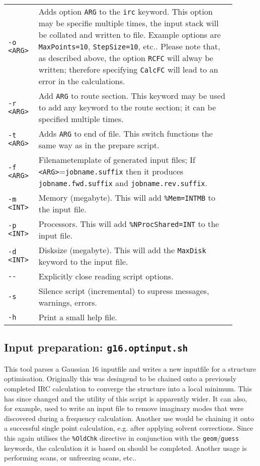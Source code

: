 \documentclass[   %
  final,          %
  a4paper         %
]{article}
\begin{document}
\begin{longtable}{p{0.1\linewidth}p{0.8\linewidth}}
  {\lstinline`-o <ARG>`} & Adds option {\lstinline`ARG`} to the \texttt{irc} keyword. 
    This option may be specifie multiple times, the input stack will be collated and written to file.
    Example options are \texttt{MaxPoints=10}, \texttt{StepSize=10}, etc.. 
    Please note that, as described above, the option \texttt{RCFC} will alway be written;
    therefore specifying \texttt{CalcFC} will lead to an error in the calculations.\\
  {\lstinline`-r <ARG>`} & Add {\lstinline`ARG`} to route section. 
    This keyword may be used to add any keyword to the route section; 
    it can be specified multiple times.\\
  {\lstinline`-t <ARG>`} & Adds {\lstinline`ARG`} to end of file. 
    This switch functions the same way as in the prepare script. \\
  {\lstinline`-f <ARG>`} & Filenametemplate of generated input files; %
    If {\lstinline`<ARG>`=}\texttt{jobname.suffix} then it produces \texttt{jobname.fwd.suffix} and \texttt{jobname.rev.suffix}. \\
  {\lstinline`-m <INT>`} & Memory (megabyte). This will add \texttt{\%Mem={\lstinline`INT`}MB} to the input file. \\
  {\lstinline`-p <INT>`} & Processors. This will add \texttt{\%NProcShared={\lstinline`INT`}} to the input file. \\
  {\lstinline`-d <INT>`} & Disksize (megabyte). This will add the \texttt{MaxDisk} keyword to the input file. \\
  {\lstinline`--`}       & Explicitly close reading script options. \\
  {\lstinline`-s`}       & Silence script (incremental) to supress messages, warnings, errors. \\
  {\lstinline`-h`}       & Print a small help file. \\
\end{longtable}

\subsection{Input preparation: \texorpdfstring{{\lstinline`g16.optinput.sh`}}{g16.optinput.sh}}
\label{sec:g16.optinput}

This tool parses a Gaussian 16 inputfile and writes a new inputfile for a structure optimisation.
Originally this was desingend to be chained onto a previously completed IRC calculation
to converge the structure into a local minimum.
This has since changed and the utility of this script is apparently wider.
It can also, for example, used to write an input file to remove imaginary modes that were 
discovered during a frequency calculation.
Another use would be chaining it onto a successful single point calculation,
e.g. after applying solvent corrections.
Since this again utilises the \texttt{\%OldChk} directive in conjunction with 
the \texttt{geom}/\texttt{guess} keywords, the calculation it is based on should be completed.
Another usage is performing scans, or unfreezing scans, etc..
\end{document}
